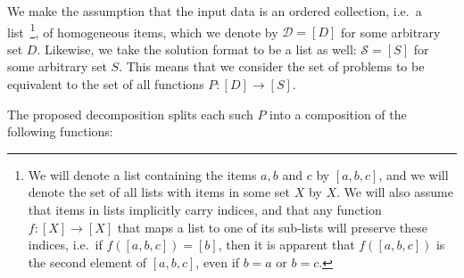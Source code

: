 We make the assumption that the input data is an ordered collection, i.e.\ a list~\footnote{We will denote a list containing the items $a, b$ and $c$ by $[a, b, c]$, and we will denote the set of all lists with items in some set $X$ by $X$. We will also assume that items in lists implicitly carry indices, and that any function $f: [X] \rightarrow [X]$ that maps a list to one of its sub-lists will preserve these indices, i.e.\ if $f([a, b, c]) = [b]$, then it is apparent that $f([a, b, c])$ is the second element of $[a, b, c]$, even if $b = a$ or $b = c$.}, of homogeneous items, which we denote by $\mathcal{D} = [D]$ for some arbitrary set $D$. Likewise, we take the solution format to be a list as well: $\mathcal{S} = [S]$ for some arbitrary set $S$. This means that we consider the set of problems to be equivalent to the set of all functions $P: [D] \rightarrow [S]$.

The proposed decomposition splits each such $P$ into a composition of the following functions:

